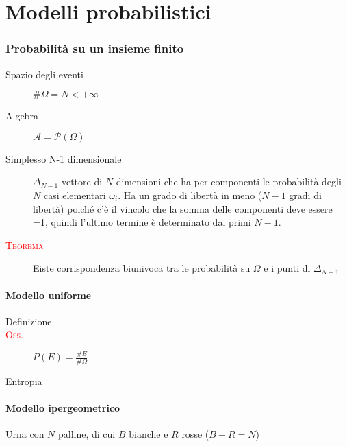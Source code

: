 \documentclass[a4paper,10pt]{article}
\newcommand{\myth}{\normalfont \scshape \textcolor{red}} %
\theoremstyle{remark}
\theoremstyle{definition}
\begin{document}
\pagebreak
\part{Modelli probabilistici}
\section{Probabilità su un insieme finito}
\begin{description}
    \item[Spazio degli eventi] $\#\Omega=N<+\infty$
    \item[Algebra] $\mathcal{A}=\mathscr{P}(\Omega)$
    \item[Simplesso N-1 dimensionale] $\Delta_{N-1}$ vettore di $N$ dimensioni che ha per componenti le probabilità degli $N$ casi elementari $\omega_i$. Ha un grado di libertà in meno ($N-1$ gradi di libertà) poiché c'è il vincolo che la somma delle componenti deve essere =1, quindi l'ultimo termine è determinato dai primi $N-1$.
    \item[\myth{Teorema}] Eiste corrispondenza biunivoca tra le probabilità su $\Omega$ e i punti di $\Delta_{N-1}$ 
\end{description}

\subsection{Modello uniforme}
\begin{description}
    \item[Definizione]
    \item[\myth{Oss.}]  $P(E)=\frac{\#E}{\#\Omega}$
    \item[Entropia] 
\end{description}

\subsection{Modello ipergeometrico}
Urna con $N$ palline, di cui $B$ bianche e $R$ rosse ($B+R=N$)
\end{document}
